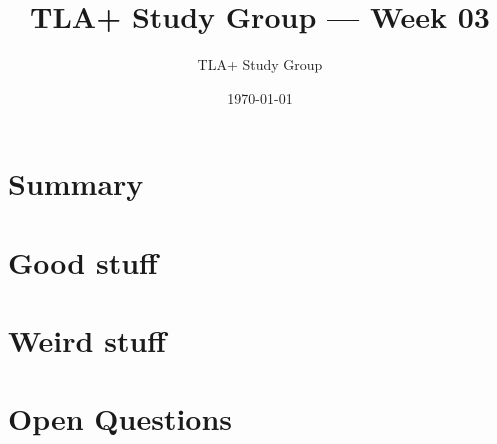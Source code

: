 \documentclass[11pt]{article}
\title{TLA+ Study Group — Week 03}
\author{TLA+ Study Group}
\date{\today}
\begin{document}
\maketitle

\section*{Summary}

\section*{Good stuff}

\section*{Weird stuff}

\section*{Open Questions}
\end{document}
